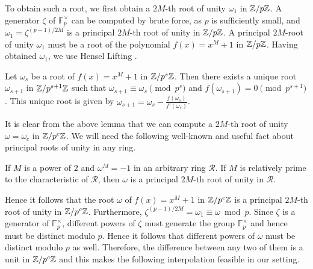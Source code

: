 \documentclass[11pt]{article}
\begin{document}
To obtain such a root, we first obtain a $2M$-th root of unity
$\omega_1$ in $\mathbb{Z}/p\mathbb{Z}$. A generator $\zeta$ of $\mathbb{F}_p^{\times}$
can be computed by brute force, as $p$ is sufficiently small, and
$\omega_1 = \zeta^{(p-1)/2M}$ is a principal $2M$-th root of unity in $\mathbb{Z}/p\mathbb{Z}$.
A principal $2M$-root of unity
$\omega_1$ must be a root of the polynomial $f(x) = x^M+1$ in $\mathbb{Z}/p\mathbb{Z}$.  Having obtained $\omega_1$,
we use Hensel Lifting \cite[Theorem 2.23]{Zuckerman}.

\begin{lemma}
  Let $\omega_s$ be a root of $f(x) = x^M + 1$ in $\mathbb{Z}/p^s\mathbb{Z}$. Then
  there exists a unique root $\omega_{s+1}$ in $\mathbb{Z}/p^{s+1}\mathbb{Z}$ such
  that $\omega_{s+1}\equiv \omega_s\pmod{p^s}$ and $f(\omega_{s+1}) =
  0\pmod{p^{s+1}}$. This unique root is given by $\omega_{s+1} =
  \omega_s - \frac{f(\omega_s)}{f'(\omega_s)}$.\end{lemma}


\noindent
It is clear from the above lemma that we can compute a $2M$-th root of
unity $\omega = \omega_c$ in $\mathbb{Z}/p^c\mathbb{Z}$. We will need the following
well-known and useful fact about principal roots of unity in any ring.

\begin{lemma}\cite[Lemma 2.1]{F09}\label{lem:Furer-principal-root}
  If $M$ is a power of $2$ and $\omega^{M} = -1$ in an arbitrary ring
  $\mathcal{R}$. If $M$ is relatively prime to the characteristic of
  $\mathcal{R}$, then $\omega$ is a principal $2M$-th root of unity in
  $\mathcal{R}$.
\end{lemma}

\noindent
Hence it follows that the root $\omega$ of $f(x) = x^M + 1$ in
$\mathbb{Z}/p^c\mathbb{Z}$ is a principal $2M$-th root of unity in $\mathbb{Z}/p^c\mathbb{Z}$.
Furthermore, $\zeta^{(p-1)/2M} = \omega_1 \equiv \omega\bmod p$. Since
$\zeta$ is a generator of $\mathbb{F}_p^\times$, different powers of
$\zeta$ must generate the group $\mathbb{F}_p^\times$ and hence must
be distinct modulo $p$. Hence it follows that different powers of
$\omega$ must be distinct modulo $p$ as well. Therefore, the
difference between any two of them is a unit in $\mathbb{Z}/p^c\mathbb{Z}$ and this
makes the following
interpolation feasible in our setting. \\
\end{document}
